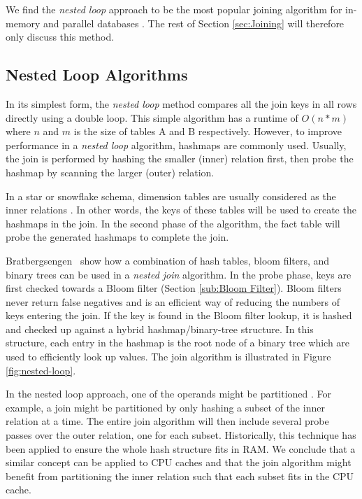 We find the \textit{nested loop} approach to be the most popular joining algorithm for in-memory and parallel databases \cite{Boncz2002-yj}. The rest of Section \ref{sec:Joining} will therefore only discuss this method.

\subsection{Nested Loop Algorithms}
\label{sub:Nested Loop Algorithms}

In its simplest form, the \textit{nested loop} method compares all the join keys in all rows directly using a double loop. This simple algorithm has a runtime of $O(n*m)$ where $n$ and $m$ is the size of tables A and B respectively. However, to improve performance in a \textit{nested loop} algorithm, hashmaps are commonly used. Usually, the join is performed by hashing the smaller (inner) relation first, then probe the hashmap by scanning the larger (outer) relation. 

In a star or snowflake schema, dimension tables are usually considered as the inner relations \cite{Barber2012-xt, Raman2013-em}. In other words, the keys of these tables will be used to create the hashmaps in the join. In the second phase of the algorithm, the fact table will probe the generated hashmaps to complete the join. 


Bratbergsengen \ea~show how a combination of hash tables, bloom filters, and binary trees can be used in a \textit{nested join} algorithm. In the probe phase, keys are first checked towards a Bloom filter (Section \ref{sub:Bloom Filter}). Bloom filters never return false negatives and is an efficient way of reducing the numbers of keys entering the join. If the key is found in the Bloom filter lookup, it is hashed and checked up against a hybrid hashmap/binary-tree structure. In this structure, each entry in the hashmap is the root node of a binary tree which are used to efficiently look up values. The join algorithm is illustrated in Figure \ref{fig:nested-loop}.

In the nested loop approach, one of the operands might be partitioned \cite{Bratbergsengen2015-ed}. For example, a join might be partitioned by only hashing a subset of the inner relation at a time. The entire join algorithm will then include several probe passes over the outer relation, one for each subset. Historically, this technique has been applied to ensure the whole hash structure fits in RAM. We conclude that a similar concept can be applied to CPU caches and that the join algorithm might benefit from partitioning the inner relation such that each subset fits in the CPU cache.

